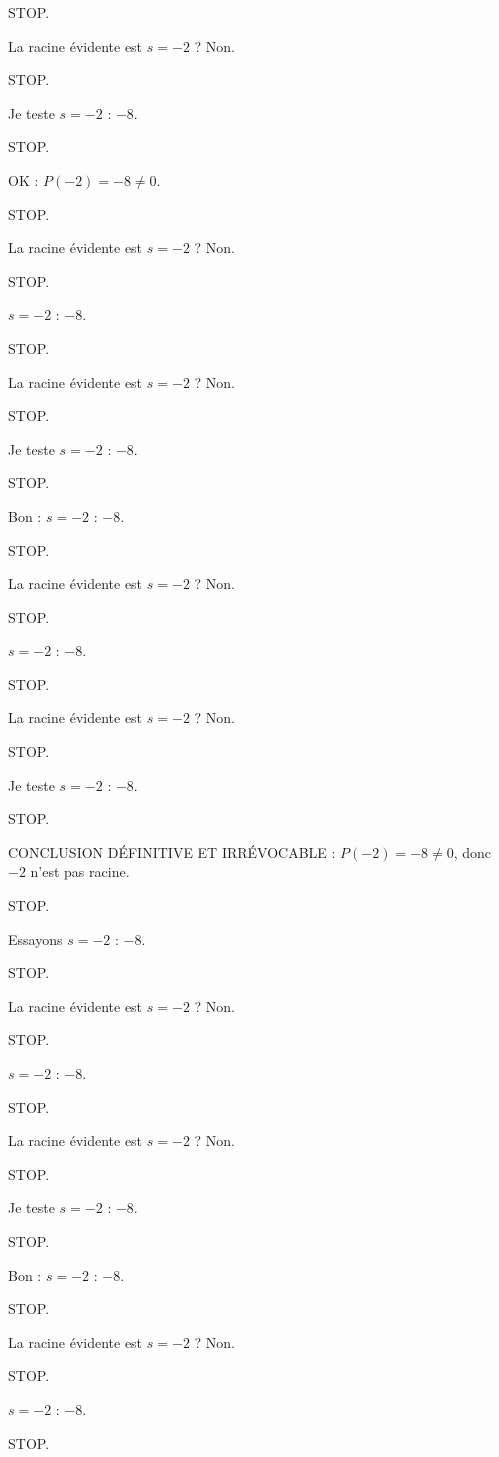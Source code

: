 \documentclass[11pt]{article}
\begin{document}
\begin{exoresolu}
\begin{enumerate}
STOP. 

La racine évidente est $s = -2$ ? Non. 

STOP. 

Je teste $s = -2$ : $-8$. 

STOP. 

OK : $P(-2) = -8 \neq 0$. 

STOP. 

La racine évidente est $s = -2$ ? Non. 

STOP. 

$s = -2$ : $-8$. 

STOP. 

La racine évidente est $s = -2$ ? Non. 

STOP. 

Je teste $s = -2$ : $-8$. 

STOP. 

Bon : $s = -2$ : $-8$. 

STOP. 

La racine évidente est $s = -2$ ? Non. 

STOP. 

$s = -2$ : $-8$. 

STOP. 

La racine évidente est $s = -2$ ? Non. 

STOP. 

Je teste $s = -2$ : $-8$. 

STOP. 

CONCLUSION DÉFINITIVE ET IRRÉVOCABLE : $P(-2) = -8 \neq 0$, donc $-2$ n'est pas racine. 

STOP. 

Essayons $s = -2$ : $-8$. 

STOP. 

La racine évidente est $s = -2$ ? Non. 

STOP. 

$s = -2$ : $-8$. 

STOP. 

La racine évidente est $s = -2$ ? Non. 

STOP. 

Je teste $s = -2$ : $-8$. 

STOP. 

Bon : $s = -2$ : $-8$. 

STOP. 

La racine évidente est $s = -2$ ? Non. 

STOP. 

$s = -2$ : $-8$. 

STOP. 


\end{enumerate}
\end{exoresolu}
\end{document}

